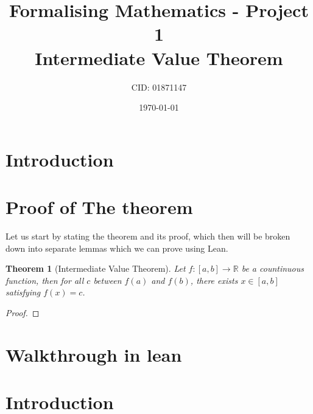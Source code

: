 \documentclass[11pt]{article}
\newcommand\R{\mathbb{R}}
\newtheorem*{theorem}{Theorem}[section]
\begin{document}
\title{Formalising Mathematics - Project 1 \\ Intermediate Value Theorem}
\date{\today}
\author{CID: 01871147}
\maketitle

\section*{ Introduction }
\section*{ Proof of The theorem }

Let us start by stating the theorem and its proof, which then will be broken down
into separate lemmas which we can prove using Lean.
\begin{theorem}[Intermediate Value Theorem]
  Let $f : [a, b] \to \R  $ be a countinuous function, then for all $c$ between
  $f(a)$ and $f(b)$, there exists $x \in [a, b] $ satisfying $f(x) = c$.
\end{theorem}

\begin{proof}

\end{proof}
\section*{ Walkthrough in lean }
\section*{ Introduction }
\end{document}
